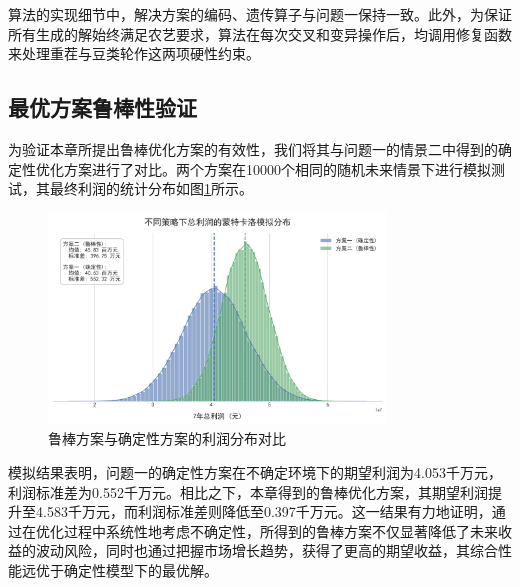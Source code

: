 算法的实现细节中，解决方案的编码、遗传算子与问题一保持一致。此外，为保证所有生成的解始终满足农艺要求，算法在每次交叉和变异操作后，均调用修复函数来处理重茬与豆类轮作这两项硬性约束。


\subsection{最优方案鲁棒性验证}


为验证本章所提出鲁棒优化方案的有效性，我们将其与问题一的情景二中得到的确定性优化方案进行了对比。两个方案在10000个相同的随机未来情景下进行模拟测试，其最终利润的统计分布如图\ref{fig:robustness_dist}所示。

\begin{figure}[H]
    \centering
    \includegraphics[width=0.8\textwidth]{figs/4问题二/鲁棒性蒙德卡诺模拟分布图.png}
    \caption{鲁棒方案与确定性方案的利润分布对比}
    \label{fig:robustness_dist}
\end{figure}

模拟结果表明，问题一的确定性方案在不确定环境下的期望利润为4.053千万元，利润标准差为0.552千万元。相比之下，本章得到的鲁棒优化方案，其期望利润提升至4.583千万元，而利润标准差则降低至0.397千万元。这一结果有力地证明，通过在优化过程中系统性地考虑不确定性，所得到的鲁棒方案不仅显著降低了未来收益的波动风险，同时也通过把握市场增长趋势，获得了更高的期望收益，其综合性能远优于确定性模型下的最优解。
